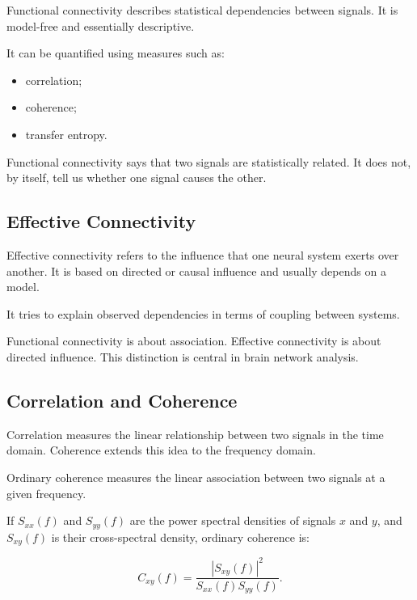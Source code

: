 Functional connectivity describes statistical dependencies between signals. It is model-free and essentially descriptive.

It can be quantified using measures such as:

\begin{itemize}[noitemsep]
    \item correlation;
    \item coherence;
    \item transfer entropy.
\end{itemize}

\begin{authornote}
Functional connectivity says that two signals are statistically related. It does not, by itself, tell us whether one signal causes the other.
\end{authornote}

\subsection{Effective Connectivity}

Effective connectivity refers to the influence that one neural system exerts over another. It is based on directed or causal influence and usually depends on a model.

It tries to explain observed dependencies in terms of coupling between systems.

\begin{authornote}
Functional connectivity is about association. Effective connectivity is about directed influence. This distinction is central in brain network analysis.
\end{authornote}

\subsection{Correlation and Coherence}

Correlation measures the linear relationship between two signals in the time domain. Coherence extends this idea to the frequency domain.

Ordinary coherence measures the linear association between two signals at a given frequency.

If $S_{xx}(f)$ and $S_{yy}(f)$ are the power spectral densities of signals $x$ and $y$, and $S_{xy}(f)$ is their cross-spectral density, ordinary coherence is:

\[
C_{xy}(f)
=
\frac{|S_{xy}(f)|^2}
{S_{xx}(f)S_{yy}(f)}.
\]

